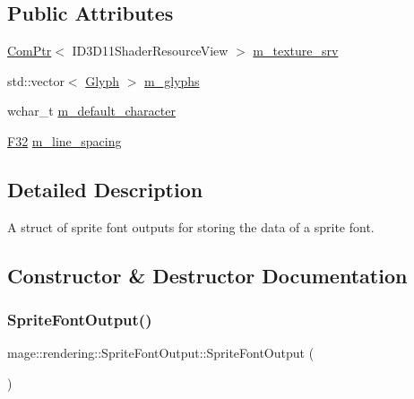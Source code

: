 \subsection*{Public Attributes}
\begin{DoxyCompactItemize}
\item 
\mbox{\hyperlink{namespacemage_ae74f374780900893caa5555d1031fd79}{Com\+Ptr}}$<$ I\+D3\+D11\+Shader\+Resource\+View $>$ \mbox{\hyperlink{structmage_1_1rendering_1_1_sprite_font_output_ab074e7aa56a34898b19172615085045d}{m\+\_\+texture\+\_\+srv}}
\item 
std\+::vector$<$ \mbox{\hyperlink{structmage_1_1rendering_1_1_glyph}{Glyph}} $>$ \mbox{\hyperlink{structmage_1_1rendering_1_1_sprite_font_output_a3ff626faa883b00e94e5dddf94fb013e}{m\+\_\+glyphs}}
\item 
wchar\+\_\+t \mbox{\hyperlink{structmage_1_1rendering_1_1_sprite_font_output_af35542b71c315b2ed6059ab53413d34c}{m\+\_\+default\+\_\+character}}
\item 
\mbox{\hyperlink{namespacemage_aa97e833b45f06d60a0a9c4fc22ae02c0}{F32}} \mbox{\hyperlink{structmage_1_1rendering_1_1_sprite_font_output_a808965bc4ade482ffac0f56bf8013933}{m\+\_\+line\+\_\+spacing}}
\end{DoxyCompactItemize}


\subsection{Detailed Description}
A struct of sprite font outputs for storing the data of a sprite font. 

\subsection{Constructor \& Destructor Documentation}
\mbox{\label{structmage_1_1rendering_1_1_sprite_font_output_a5bc62257f436c6836a8fd0b3c306c026}} 
\subsubsection{\texorpdfstring{Sprite\+Font\+Output()}{SpriteFontOutput()}\hspace{0.1cm}{\footnotesize\ttfamily [1/3]}}
{\footnotesize\ttfamily mage\+::rendering\+::\+Sprite\+Font\+Output\+::\+Sprite\+Font\+Output (\begin{DoxyParamCaption}{ }\end{DoxyParamCaption})\hspace{0.3cm}{\ttfamily [default]}}

